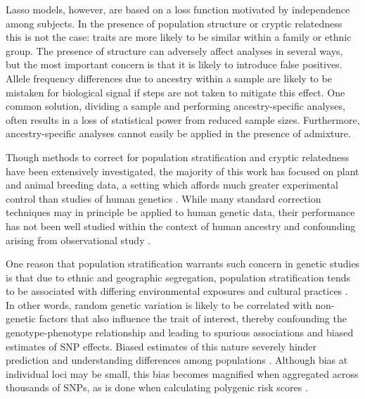 Lasso models, however, are based on a loss function motivated by independence among subjects. In the presence of population structure or cryptic relatedness this is not the case: traits are more likely to be similar within a family or ethnic group. The presence of structure can adversely affect analyses in several ways, but the most important concern is that it is likely to introduce false positives. Allele frequency differences due to ancestry within a sample are likely to be mistaken for biological signal if steps are not taken to mitigate this effect. One common solution, dividing a sample and performing ancestry-specific analyses, often results in a loss of statistical power from reduced sample sizes. Furthermore, ancestry-specific analyses cannot easily be applied in the presence of admixture.

Though methods to correct for population stratification and cryptic relatedness have been extensively investigated, the majority of this work has focused on plant and animal breeding data, a setting which affords much greater experimental control than studies of human genetics \citep{Amin2007, hoffman2013correcting, price2006principal, rakitsch2013lasso, bhatnagar2020simultaneous, Sillanpaeae2011}. While many standard correction techniques may in principle be applied to human genetic data, their performance has not been well studied within the context of human ancestry and confounding arising from observational study \citep{lawson2019population, barton2019population}.

One reason that population stratification warrants such concern in genetic studies is that due to ethnic and geographic segregation, population stratification tends to be associated with differing environmental exposures and cultural practices \citep{thornton2015statistical, browning2011population}. In other words, random genetic variation is likely to be correlated with non-genetic factors that also influence the trait of interest, thereby confounding the genotype-phenotype relationship and leading to spurious associations and biased estimates of SNP effects. Biased estimates of this nature severely hinder prediction and understanding differences among populations \citep{barton2019population}. Although bias at individual loci may be small, this bias becomes magnified when aggregated across thousands of SNPs, as is done when calculating polygenic risk scores \citep{barton2019population, peterson2019genome}.

